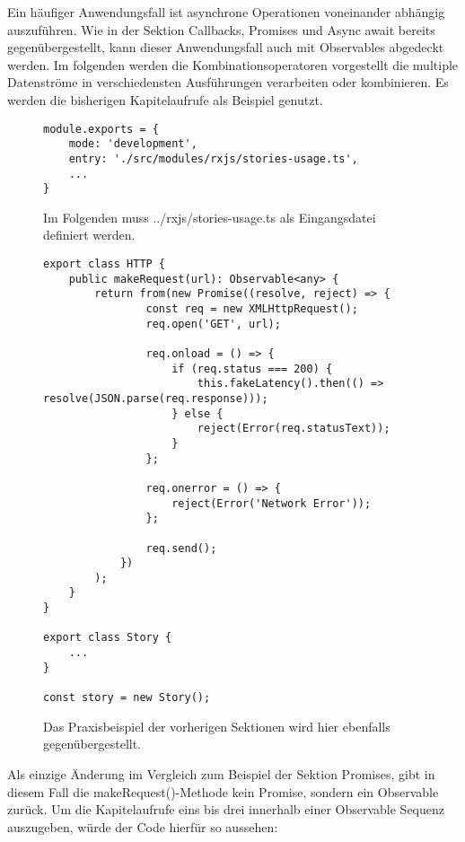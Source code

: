 \noindent
Ein häufiger Anwendungsfall ist asynchrone Operationen voneinander abhängig auszuführen. Wie in der Sektion Callbacks, Promises und Async await bereits gegenübergestellt, kann dieser Anwendungsfall auch mit Observables abgedeckt werden. Im folgenden werden die Kombinationsoperatoren vorgestellt die multiple Datenströme in verschiedensten Ausführungen verarbeiten oder kombinieren. Es werden die bisherigen Kapitelaufrufe als Beispiel genutzt. 

\begin{figure}[H]
\begin{lstlisting}[basicstyle=\small]
module.exports = {
    mode: 'development',
    entry: './src/modules/rxjs/stories-usage.ts',
    ...
}
\end{lstlisting}
\caption{Im Folgenden muss ../rxjs/stories-usage.ts als Eingangsdatei definiert werden.}
\end{figure}

\begin{figure}[H]
\begin{lstlisting}[basicstyle=\small]
export class HTTP {
    public makeRequest(url): Observable<any> {
        return from(new Promise((resolve, reject) => {
                const req = new XMLHttpRequest();
                req.open('GET', url);

                req.onload = () => {
                    if (req.status === 200) {
                        this.fakeLatency().then(() => resolve(JSON.parse(req.response)));
                    } else {
                        reject(Error(req.statusText));
                    }
                };

                req.onerror = () => {
                    reject(Error('Network Error'));
                };

                req.send();
            })
        );
    }
}

export class Story {
    ...
}

const story = new Story();
\end{lstlisting}
\caption{Das Praxisbeispiel der vorherigen Sektionen wird hier ebenfalls gegenübergestellt.}
\end{figure}

\noindent
Als einzige Änderung im Vergleich zum Beispiel der Sektion Promises, gibt in diesem Fall die makeRequest()-Methode kein Promise, sondern ein Observable zurück. Um die Kapitelaufrufe eins bis drei innerhalb einer Observable Sequenz auszugeben, würde der Code hierfür so aussehen:

